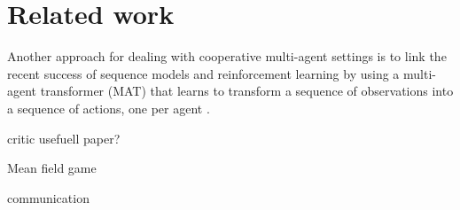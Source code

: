 \section{Related work}


Another approach for dealing with cooperative multi-agent settings is to link the recent success of sequence models and reinforcement learning by using a multi-agent transformer (MAT) that learns to transform a sequence of observations into a sequence of actions, one per agent \citep{wen2022multiagent}.

critic usefuell paper?

Mean field game


communication

